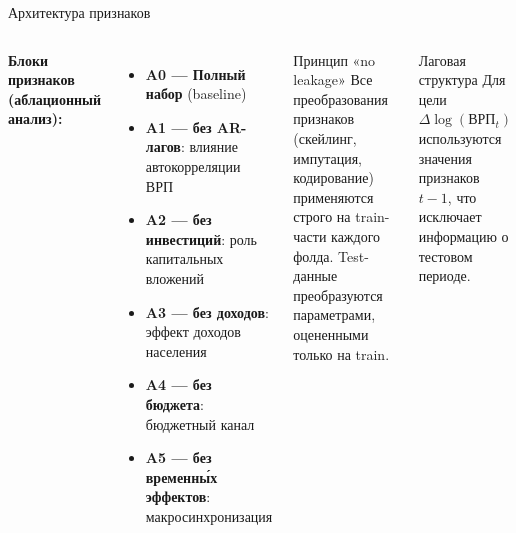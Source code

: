 \documentclass[aspectratio=169,10pt]{beamer}
\begin{document}
\begin{frame}{Архитектура признаков}
\begin{columns}[T]
\textbf{Блоки признаков (аблационный анализ):}
\medskip
\begin{itemize}\setlength\itemsep{5pt}
  \item \textbf{A0 — Полный набор} (baseline)
  \item \textbf{A1 — без AR-лагов}: влияние автокорреляции ВРП
  \item \textbf{A2 — без инвестиций}: роль капитальных вложений
  \item \textbf{A3 — без доходов}: эффект доходов населения
  \item \textbf{A4 — без бюджета}: бюджетный канал
  \item \textbf{A5 — без временны́х эффектов}: макросинхронизация
\end{itemize}
\begin{block}{Принцип «no leakage»}
Все преобразования признаков (скейлинг, импутация, кодирование) применяются строго на train-части каждого фолда. Test-данные преобразуются параметрами, оцененными только на train.
\end{block}
\medskip
\begin{block}{Лаговая структура}
Для цели $\Delta\log(\text{ВРП}_t)$ используются значения признаков $t-1$, что исключает информацию о тестовом периоде.
\end{block}
\end{columns}
\end{frame}
\end{document}
